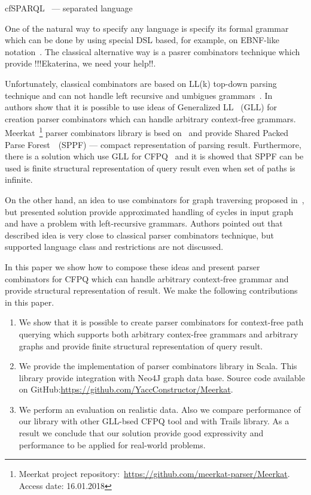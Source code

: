 cfSPARQL~\cite{CFGonRDF} --- separated language


One of the natural way to specify any language is specify its formal grammar which can be done by using special DSL based, for example, on EBNF-like notation~\cite{EBNFISO}.
The classical alternative way is a pasrer combinators technique which provide !!!Ekaterina, we need your help!!.

Unfortunately, classical combinators are based on LL(k) top-down parsing technique and can not handle left recursive and umbigues grammars~\cite{!!!}.
In~\cite{Meerkat} authors show that it is possible to use ideas of Generalized LL~\cite{scott2010gll} (GLL) for creation parser combinators which can handle arbitrary context-free grammars.
Meerkat~\footnote{Meerkat project repository:~\url{https://github.com/meerkat-parser/Meerkat}. Access date: 16.01.2018} parser combinators library is bsed on~\cite{Meerkat} and provide Shared Packed Parse Forest~\cite{SPPF}~(SPPF) --- compact representation of parsing result. 
Furthermore, there is a solution which use GLL for CFPQ~\cite{GrigorevR16} and it is showed that SPPF can be used is finite structural representation of query result even when set of paths is infinite.

On the other hand, an idea to use combinators for graph traversing proposed in~\cite{ScalaGraphParsing}, but presented solution provide approximated handling of cycles in input graph and have a problem with left-recursive grammars. 
Authors pointed out that described idea is very close to classical parser combinators technique, but supported language class and restrictions are not discussed.

In this paper we show how to compose these ideas and present parser combinators for CFPQ which can handle arbitrary context-free grammar and provide structural representation of result.
We make the following contributions in this paper.

\begin{enumerate}
\item We show that it is possible to create parser combinators for context-free path querying which supports both arbitrary contex-free grammars and arbitrary graphs and provide finite structural representation of query result.
\item We provide the implementation of parser combinators library in Scala. This library provide integration with Neo4J graph data base. Source code available on GitHub:\url{https://github.com/YaccConstructor/Meerkat}.
\item We perform an evaluation on realistic data. 
Also we compare performance of our library with other GLL-bsed CFPQ tool and with Trails library.
As a result we conclude that our solution provide good expressivity and performance to be applied for real-world problems. 
\end{enumerate}